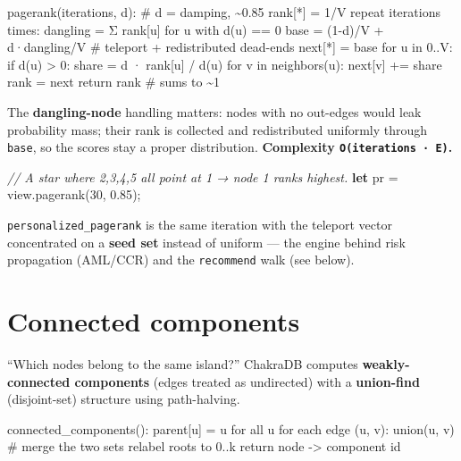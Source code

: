 \documentclass[
  11pt,
  openany]{book}
\newenvironment{Shaded}{}{}
\newcommand{\CommentTok}[1]{\textcolor[rgb]{0.38,0.63,0.69}{\textit{#1}}}
\newcommand{\DecValTok}[1]{\textcolor[rgb]{0.25,0.63,0.44}{#1}}
\newcommand{\KeywordTok}[1]{\textcolor[rgb]{0.00,0.44,0.13}{\textbf{#1}}}
\newcommand{\NormalTok}[1]{#1}
\newcommand{\OperatorTok}[1]{\textcolor[rgb]{0.40,0.40,0.40}{#1}}
\begin{document}
\begin{Shaded}
\begin{Highlighting}[]
\NormalTok{pagerank(iterations, d):            \# d = damping, \textasciitilde{}0.85}
\NormalTok{  rank[*] = 1/V}
\NormalTok{  repeat \textasciigrave{}iterations\textasciigrave{} times:}
\NormalTok{    dangling = Σ rank[u] for u with d(u) == 0}
\NormalTok{    base = (1{-}d)/V + d·dangling/V     \# teleport + redistributed dead{-}ends}
\NormalTok{    next[*] = base}
\NormalTok{    for u in 0..V:}
\NormalTok{      if d(u) \textgreater{} 0:}
\NormalTok{        share = d · rank[u] / d(u)}
\NormalTok{        for v in neighbors(u): next[v] += share}
\NormalTok{    rank = next}
\NormalTok{  return rank                         \# sums to \textasciitilde{}1}
\end{Highlighting}
\end{Shaded}

The \textbf{dangling-node} handling matters: nodes with no out-edges
would leak probability mass; their rank is collected and redistributed
uniformly through \texttt{base}, so the scores stay a proper
distribution. \textbf{Complexity \texttt{O(iterations\ ·\ E)}.}

\begin{Shaded}
\begin{Highlighting}[]
\CommentTok{// A star where 2,3,4,5 all point at 1 → node 1 ranks highest.}
\KeywordTok{let}\NormalTok{ pr }\OperatorTok{=}\NormalTok{ view}\OperatorTok{.}\NormalTok{pagerank(}\DecValTok{30}\OperatorTok{,} \DecValTok{0.85}\NormalTok{)}\OperatorTok{;}
\end{Highlighting}
\end{Shaded}

\texttt{personalized\_pagerank} is the same iteration with the teleport
vector concentrated on a \textbf{seed set} instead of uniform --- the
engine behind risk propagation (AML/CCR) and the \texttt{recommend} walk
(see below).

\section{Connected components}\label{connected-components}

``Which nodes belong to the same island?'' ChakraDB computes
\textbf{weakly-connected components} (edges treated as undirected) with
a \textbf{union-find} (disjoint-set) structure using path-halving.

\begin{Shaded}
\begin{Highlighting}[]
\NormalTok{connected\_components():}
\NormalTok{  parent[u] = u for all u}
\NormalTok{  for each edge (u, v):}
\NormalTok{    union(u, v)          \# merge the two sets}
\NormalTok{  relabel roots to 0..k}
\NormalTok{  return node {-}\textgreater{} component id}
\end{Highlighting}
\end{Shaded}
\end{document}
